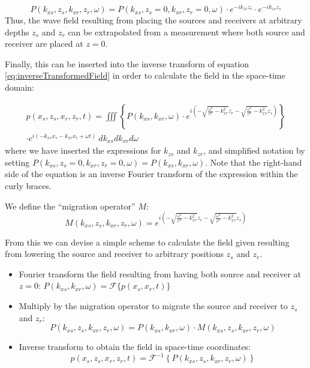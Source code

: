 \documentclass{article}%
\begin{document}
\begin{equation}
	P(k_{xs},z_s,k_{xr},z_r,\omega) = P(k_{xs},z_s=0,k_{xr},z_r=0,\omega) \cdot e^{-i k_{zr} z_r} \cdot e^{-i k_{zs} z_s}
\label{eq:}
\end{equation}
Thus, the wave field resulting from placing the sources and receivers at arbitrary depths $z_s$ and $z_r$ can be extrapolated from a measurement where both source and receiver are placed at $z = 0$. 

Finally, this can be inserted into the inverse transform of equation \ref{eq:inverseTransformedField} in order to calculate the field in the space-time domain:

\begin{multline}
	p(x_s,z_s,x_r,z_r,t) = \iiint \left\{ P(k_{xs},k_{xr},\omega) 
		\cdot e^{i \left( - \sqrt{\frac{\omega^2}{c^2} - k_{xr}^2} z_r - \sqrt{\frac{\omega^2}{c^2} - k_{xs}^2} z_s \right)} 
			\right\} \\
		\cdot e^{i\left(-k_{xs}x_s - k_{xr}x_r + \omega t \right)} \ dk_{xs} dk_{xr} d\omega
\label{eq:inverseTransformedField}
\end{multline}
where we have inserted the expressions for $k_{zs}$ and $k_{zr}$, and simplified notation by setting $P(k_{xs}, z_s = 0, k_{xr}, z_r = 0,\omega) = P(k_{xs},k_{xr},\omega)$. Note that the right-hand side of the equation is an inverse Fourier transform of the expression within the curly braces. 

We define the ``migration operator'' $M$:
	\begin{equation}
		M(k_{xs},z_s,k_{xr},z_r,\omega) = 
			e^{i \left( - \sqrt{\frac{\omega^2}{c^2} - k_{xr}^2} z_r - \sqrt{\frac{\omega^2}{c^2} - k_{xs}^2} z_s \right)}
	\label{eq:}
	\end{equation}

From this we can devise a simple scheme to calculate the field given resulting from lowering the source and receiver to arbitrary positions $z_s$ and $z_r$. 

\begin{itemize}
	\item Fourier transform the field resulting from having both source and receiver at $z=0$: $P(k_{xs},k_{xr},\omega) = \mathcal{F} \{ p(x_s,x_r,t)\}$
	
	\item Multiply by the migration operator to migrate the source and receiver to $z_s$ and $z_r$: 
	\begin{equation}
		P(k_{xs},z_s,k_{xr},z_r,\omega) = P(k_{xs},k_{xr},\omega) \cdot M(k_{xs},z_s,k_{xr},z_r,\omega)
	\label{eq:}
	\end{equation}

	\item Inverse transform to obtain the field in space-time coordinates: 
	\begin{equation}
		p(x_s,z_s,x_r,z_r,t) = \mathcal{F}^{-1} \left\{ P(k_{xs},z_s,k_{xr},z_r,\omega) \right\}
	\label{eq:}
	\end{equation}
\end{itemize}
\end{document}
